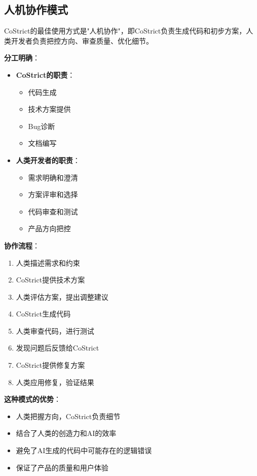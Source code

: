 ﻿\documentclass[12pt,a4paper]{article}
\begin{document}
\subsection{人机协作模式}

CoStrict的最佳使用方式是"人机协作"，即CoStrict负责生成代码和初步方案，人类开发者负责把控方向、审查质量、优化细节。

\textbf{分工明确}：

\begin{itemize}
    \item \textbf{CoStrict的职责}：
        \begin{itemize}
            \item 代码生成
            \item 技术方案提供
            \item Bug诊断
            \item 文档编写
        \end{itemize}
    \item \textbf{人类开发者的职责}：
        \begin{itemize}
            \item 需求明确和澄清
            \item 方案评审和选择
            \item 代码审查和测试
            \item 产品方向把控
        \end{itemize}
\end{itemize}

\textbf{协作流程}：
\begin{enumerate}
    \item 人类描述需求和约束
    \item CoStrict提供技术方案
    \item 人类评估方案，提出调整建议
    \item CoStrict生成代码
    \item 人类审查代码，进行测试
    \item 发现问题后反馈给CoStrict
    \item CoStrict提供修复方案
    \item 人类应用修复，验证结果
\end{enumerate}

\textbf{这种模式的优势}：
\begin{itemize}
    \item 人类把握方向，CoStrict负责细节
    \item 结合了人类的创造力和AI的效率
    \item 避免了AI生成的代码中可能存在的逻辑错误
    \item 保证了产品的质量和用户体验
\end{itemize}
\end{document}
